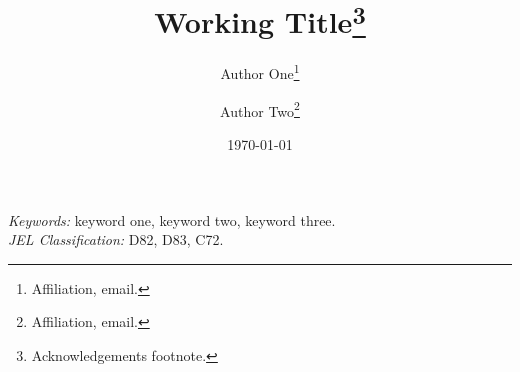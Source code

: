 \documentclass[11pt]{article}
\title{Working Title\thanks{Acknowledgements footnote.}}
\author{Author One\thanks{Affiliation, email.} \and Author Two\thanks{Affiliation, email.}}
\date{\today}
\begin{document}
\maketitle

\begin{abstract}

\end{abstract}

\medskip\noindent\textit{Keywords:} keyword one, keyword two, keyword three.\\
\textit{JEL Classification:} D82, D83, C72.












\appendix
\end{document}
